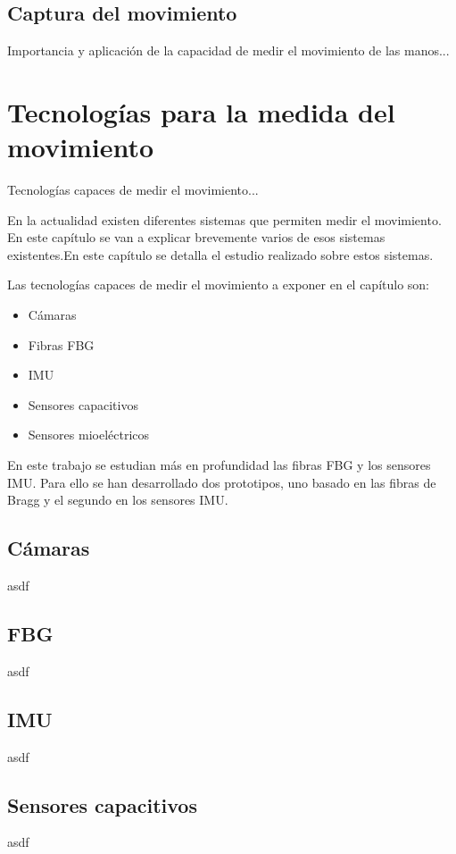 \subsection{Captura del movimiento}
\label{sec:captura2}
Importancia y aplicación de la capacidad de medir el movimiento de las manos...

\section{Tecnologías para la medida del movimiento}
\label{sec:tecnologias2}

Tecnologías capaces de medir el movimiento...


En la actualidad existen diferentes sistemas que permiten medir el movimiento. En este capítulo se van a explicar brevemente varios de esos sistemas existentes.En este capítulo se detalla el estudio realizado sobre estos sistemas.


Las tecnologías capaces de medir el movimiento a exponer en el capítulo son:
\begin{itemize}
	\item {Cámaras}
	\item {Fibras FBG}
	\item {IMU}
	\item {Sensores capacitivos}
	\item {Sensores mioeléctricos}
\end{itemize}

En este trabajo se estudian más en profundidad las fibras FBG y los sensores IMU. Para ello se han desarrollado dos prototipos, uno basado en las fibras de Bragg y el segundo en los sensores IMU.

\subsection{Cámaras}
\label{sec:camaras2}
asdf

\subsection{FBG}
\label{sec:fbg2}
asdf

\subsection{IMU}
\label{sec:imu2}
asdf

\subsection{Sensores capacitivos}
\label{sec:capacitivos2}
asdf

